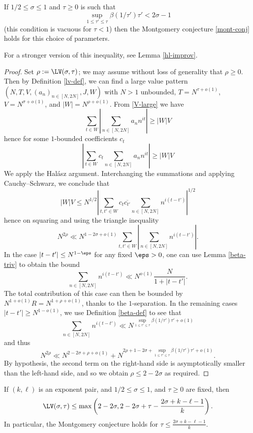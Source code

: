 \begin{theorem}\label{montgomery-lv} If $1/2 \leq \sigma \leq 1$ and $\tau \geq 0$ is such that
\begin{equation}\label{tab}
\sup_{1 \leq \tau' \leq \tau} \beta(1/\tau') \tau' < 2\sigma - 1
\end{equation}
(this condition is vacuous for $\tau < 1$) then the Montgomery conjecture \eqref{mont-conj} holds for this choice of parameters.
\end{theorem}

For a stronger version of this inequality, see Lemma \ref{hl-improv}.

\begin{proof}  Set $\rho := \LV(\sigma,\tau)$; we may assume without loss of generality that $\rho \geq 0$.  Then by Definition \ref{lv-def}, we can find a large value pattern $(N,T,V,(a_n)_{n \in [N,2N]},J,W)$  with $N > 1$ unbounded, $T = N^{\tau + o(1)}$, $V = N^{\sigma + o(1)}$, and $|W| = N^{\rho+o(1)}$.  From \eqref{V-large} we have
$$ \sum_{t \in W} \left|\sum_{n \in [N,2N]} a_n n^{it} \right| \geq |W|V$$
hence for some $1$-bounded coefficients $c_t$
$$ \left|\sum_{t \in W} c_t \sum_{n \in [N,2N]} a_n n^{it} \right| \geq |W|V$$
We apply the Hal\'asz argument. Interchanging the summations and applying Cauchy--Schwarz, we conclude that
$$ |W|V \leq N^{1/2} \left|\sum_{t, t' \in W} c_t \overline{c_{t'}} \sum_{n \in [N,2N]} n^{i(t-t')} \right|^{1/2}$$
hence on squaring and using the triangle inequality
$$ N^{2\rho} \ll N^{1-2\sigma+o(1)} \sum_{t,t' \in W} \left|\sum_{n \in [N,2N]} n^{i(t-t')} \right|.$$
In the case $|t - t'| \leq N^{1-\eps}$ for any fixed $\eps>0$, one can use Lemma \ref{beta-triv} to obtain the bound
$$ \sum_{n \in [N,2N]} n^{i(t-t')} \ll N^{o(1)} \frac{N}{1 + |t - t'|}.$$
The total contribution of this case can then be bounded by $N^{1+o(1)} R = N^{1+\rho+o(1)}$, thanks to the $1$-separation.
In the remaining cases $|t - t'| \geq N^{1-o(1)}$, we use Definition \ref{beta-def} to see that
$$ \sum_{n \in [N,2N]} n^{i(t-t')} \ll N^{\sup_{1 \leq \tau' \leq \tau} \beta(1/\tau') \tau' + o(1)}$$
and thus
$$ N^{2\rho} \ll N^{2-2\sigma+\rho+o(1)} + N^{2\rho + 1-2\sigma+\sup_{1 \leq \tau' \leq \tau} \beta(1/\tau') \tau' + o(1)}.$$
By hypothesis, the second term on the right-hand side is asymptotically smaller than the left-hand side, and so we obtain $\rho \leq 2-2\sigma$ as required.
\end{proof}

\begin{corollary}\label{exp-lv}  If $(k,\ell)$ is an exponent pair, and $1/2 \leq \sigma \leq 1$, and $\tau \geq 0$ are fixed, then
$$\LV(\sigma,\tau) \leq \max\left( 2-2\sigma, 2 - 2\sigma + \tau - \frac{2\sigma+k-\ell-1}{k} \right).$$
In particular, the Montgomery conjecture holds for $\tau \leq \frac{2\sigma+k-\ell-1}{k}$.
\end{corollary}

